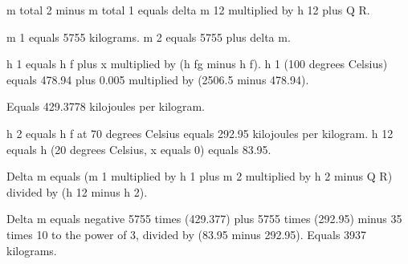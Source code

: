 m total 2 minus m total 1 equals delta m 12 multiplied by h 12 plus Q R.  

m 1 equals 5755 kilograms.  
m 2 equals 5755 plus delta m.  

h 1 equals h f plus x multiplied by (h fg minus h f).  
h 1 (100 degrees Celsius) equals 478.94 plus 0.005 multiplied by (2506.5 minus 478.94).  

Equals 429.3778 kilojoules per kilogram.  

h 2 equals h f at 70 degrees Celsius equals 292.95 kilojoules per kilogram.  
h 12 equals h (20 degrees Celsius, x equals 0) equals 83.95.  

Delta m equals (m 1 multiplied by h 1 plus m 2 multiplied by h 2 minus Q R) divided by (h 12 minus h 2).

Delta m equals negative 5755 times (429.377) plus 5755 times (292.95) minus 35 times 10 to the power of 3, divided by (83.95 minus 292.95).  
Equals 3937 kilograms.